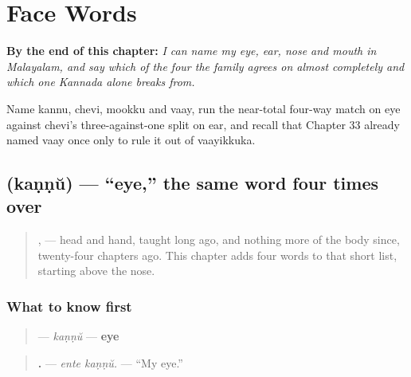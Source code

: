 
\chapter{Face Words}
\label{ch:ml-face-words}

\begin{chapteropening}
\textbf{By the end of this chapter:} \emph{I can name my eye, ear, nose and mouth in Malayalam, and say which of the four the family agrees on almost completely and which one Kannada alone breaks from.}

Name kannu, chevi, mookku and vaay, run the near-total four-way match on eye against chevi's three-against-one split on ear, and recall that Chapter 33 already named vaay once only to rule it out of vaayikkuka.
\end{chapteropening}

\section[\texorpdfstring{\ml{കണ്ണ്} (kaṇṇŭ)}{കണ്ണ് (kaṇṇŭ)}]{ (kaṇṇŭ) — \textquotedblleft{}eye,\textquotedblright{} the same word four times over}

\label{lesson:ML-C37-kannu}



\begin{quote}
\textbf{}, \textbf{} — head and hand, taught long ago, and nothing more of the body since, twenty-four chapters ago. This chapter adds four words to that short list, starting above the nose.
\end{quote}

\subsection*{What to know first}
\begin{quote}
\textbf{} — \emph{kaṇṇŭ} — \textbf{eye}
\end{quote}

\begin{quote}
\textbf{ .} — \emph{ente kaṇṇŭ.} — \textquotedblleft{}My eye.\textquotedblright{}
\end{quote}

